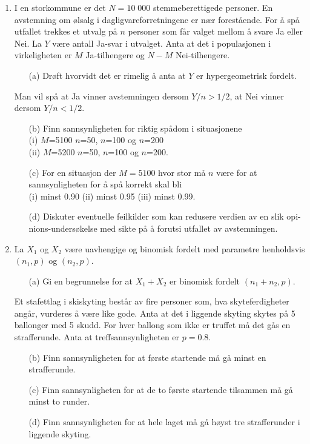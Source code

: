 \begin{enumerate}
\item I en storkommune er det $N=10\; 000$ stemmeberettigede personer.
     En avstemning om ølsalg i dagligvareforretningene er nær
      forestående. For å spå utfallet trekkes et utvalg på
     $n$ personer som får valget mellom å svare Ja eller Nei. La
     $Y$ være antall Ja-svar i utvalget. Anta at det i
     populasjonen i virkeligheten er $M$ Ja-tilhengere og $N-M$
     Nei-tilhengere.
     \begin{itemize}
     \item[(a)]  Drøft hvorvidt det er rimelig å anta at $Y$ er
          hypergeometrisk fordelt.
     \end{itemize}
     Man vil spå at Ja vinner avstemningen dersom $Y/n>1/2$, at
     Nei vinner dersom $Y/n<1/2$.
     \begin{itemize}
     \item[(b)]  Finn sannsynligheten for riktig spådom i situasjonene \\
          (i)  $M$=5100 $n$=50, $n$=100 og $n$=200 \\
          (ii) $M$=5200 $n$=50, $n$=100 og $n$=200.
     \item[(c)] For en situasjon der $M=5100$ hvor stor må $n$ være for
          at sannsynligheten for å spå korrekt skal bli \\
          (i) minst 0.90  (ii) minst 0.95  (iii) minst 0.99.
     \item[(d)]  Diskuter eventuelle feilkilder som kan redusere verdien
          av en slik opi-nions-undersøkelse med sikte på å forutsi
          utfallet av avstemningen.
     \end{itemize}

\item La $X_1$ og $X_2$ være uavhengige og binomisk fordelt med
     parametre henholdsvis $(n_1,p)$ og $(n_2,p)$.
     \begin{itemize}
     \item[(a)]  Gi en begrunnelse for at $X_1+X_2$ er
          binomisk fordelt $(n_1+n_2,p)$.
     \end{itemize}
     Et stafettlag i skiskyting består av fire personer som, hva
     skyteferdigheter angår, vurderes å være like gode. Anta at
     det i liggende skyting skytes på 5 ballonger med 5 skudd.
     For hver ballong som ikke er truffet må det gås en
     strafferunde. Anta at treffsannsynligheten er $p=0.8$.
     \begin{itemize}
     \item[(b)]  Finn sannsynligheten for at første startende må gå
          minst en straffe\-runde.
     \item[(c)]  Finn sannsynligheten for at de to første startende
          tilsammen må gå minst to runder.
     \item[(d)]  Finn sannsynligheten for at hele laget må gå høyst
             tre strafferunder i liggende skyting.
     \end{itemize}


\end{enumerate}
